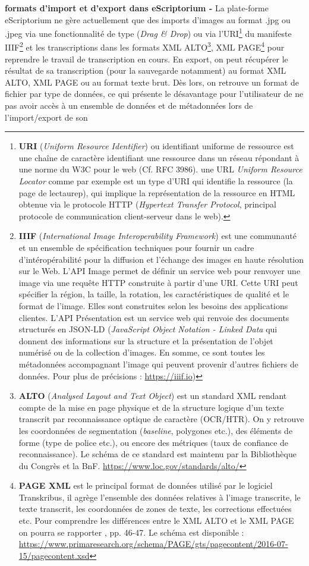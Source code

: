 \textbf{formats d'import et d'export dans eScriptorium -}
La plate-forme eScriptorium ne gère actuellement que des imports d'images au format .jpg ou .jpeg via une fonctionnalité de type  (\textit{Drag \& Drop}) ou via l'URI\footnote{\textbf{URI} (\textit{Uniform Resource Identifier}) ou identifiant uniforme de ressource est une chaîne de caractère identifiant une ressource dans un réseau répondant à une norme du W3C pour le web (Cf. RFC 3986). une URL \textit{Uniform Resource Locator} comme par exemple  est un type d'URI qui identifie la ressource (la page de lectaurep), qui implique la représentation de la ressource en HTML obtenue via le protocole HTTP (\textit{Hypertext Transfer Protocol}, principal protocole de communication client-serveur dans le web).} du manifeste IIIF\footnote{\textbf{IIIF} (\textit{International Image Interoperability Framework}) est une communauté et un ensemble de spécification techniques pour fournir un cadre d'intéropérabilité pour la diffusion et l'échange des images en haute résolution sur le Web. L'API Image permet de définir un service web pour renvoyer une image via une requête HTTP construite à partir d'une URI. Cette URI peut spécifier la région, la taille, la rotation, les caractéristiques de qualité et le format de l'image. Elles sont construites selon les besoins des applications clientes. L'API Présentation est un service web qui renvoie des documents structurés en JSON-LD (\textit{JavaScript Object Notation - Linked Data} qui donnent des informations sur la structure et la présentation de l'objet numérisé ou de la collection d'images. En somme, ce sont toutes les métadonnées accompagnant l'image qui peuvent provenir d'autres fichiers de données. Pour plus de précisions : \url{https://iiif.io})} et les transcriptions dans les formats XML ALTO\footnote{\textbf{ALTO} (\textit{Analysed Layout and Text Object}) est un standard XML rendant compte de la mise en page physique et de la structure logique d'un texte transcrit par reconnaissance optique de caractère (OCR/HTR). On y retrouve les coordonnées de segmentation (\textit{baseline}, polygones etc.), des éléments de forme (type de police etc.), ou encore des métriques (taux de confiance de reconnaissance). Le schéma de ce standard est maintenu par la Bibliothèque du Congrès et la BnF. \url{https://www.loc.gov/standards/alto/}}, XML PAGE\footnote{\textbf{PAGE XML} est le principal format de données utilisé par le logiciel Transkribus, il agrège l'ensemble des données relatives à l'image transcrite, le texte transcrit, les coordonnées de zones de texte, les corrections effectuées etc. Pour comprendre les différences entre le XML ALTO et le XML PAGE on pourra se rapporter \cite{bonhomme_defis_2018}, pp. 46-47. Le schéma est disponible : \url{https://www.primaresearch.org/schema/PAGE/gts/pagecontent/2016-07-15/pagecontent.xsd}} pour reprendre le travail de transcription en cours. En export, on peut récupérer le résultat de sa transcription (pour la sauvegarde notamment) au format XML ALTO, XML PAGE ou au format texte brut. Dès lors, on retrouve un format de fichier par type de données, ce qui présente le désavantage pour l'utilisateur de ne pas avoir accès à un ensemble de données et de métadonnées lors de l'import/export de son 